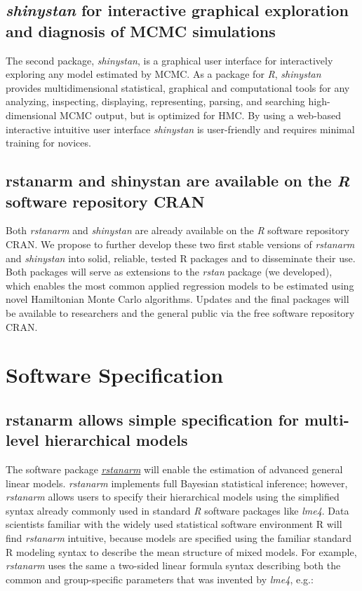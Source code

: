 \documentclass[11pt,notitlepage]{article}
\begin{document}
\subsection*{\textit{shinystan} for interactive graphical exploration and diagnosis of MCMC simulations}  
The second package, \textit{shinystan}, is a graphical user interface for interactively exploring any model estimated by MCMC. As a 
package for \textit{R}, \textit{shinystan}  provides multidimensional statistical, graphical and computational tools for any analyzing,
inspecting, displaying, representing, parsing, and searching high-dimensional MCMC output, but is optimized for HMC. By using a web-based 
interactive intuitive user interface \textit{shinystan} is user-friendly and requires minimal training for novices.

\subsection*{rstanarm and shinystan are available on the \textit{R} software repository CRAN}
Both \textit{rstanarm} \cite{rstanarm} and \textit{shinystan} \cite{shinystan, Team2015} are already 
available on the \textit{R} software  repository CRAN. We propose to further develop 
these two first stable versions of \textit{rstanarm} and \textit{shinystan} into solid, 
reliable, tested R packages and to disseminate their use. Both packages will serve as extensions to the \textit{rstan} 
package (we developed), which enables the most common applied regression models to be estimated 
using novel Hamiltonian Monte Carlo algorithms. Updates and the final packages will be available to researchers 
and the general public via the free software repository CRAN. 

\section*{Software Specification}

\subsection*{rstanarm allows simple specification for multi-level hierarchical models}
The software package \href{https://github.com/stan-dev/rstanarm}{\textit{rstanarm}}
will enable the estimation of advanced general linear models. 
\textit{rstanarm} implements full Bayesian statistical inference;  
however, \textit{rstanarm} allows users to specify their 
hierarchical models using the simplified syntax already commonly 
used in standard \textit{R} software packages like \textit{lme4}. 
Data scientists familiar with the widely used statistical software environment R will 
find \textit{rstanarm} intuitive, because models are specified using the familiar 
standard R modeling syntax to describe the mean structure of mixed models. 
For example, \textit{rstanarm} uses the same a two-sided 
linear formula syntax describing both the common and group-specific parameters that was 
invented by \textit{lme4},  e.g.:
\end{document}

